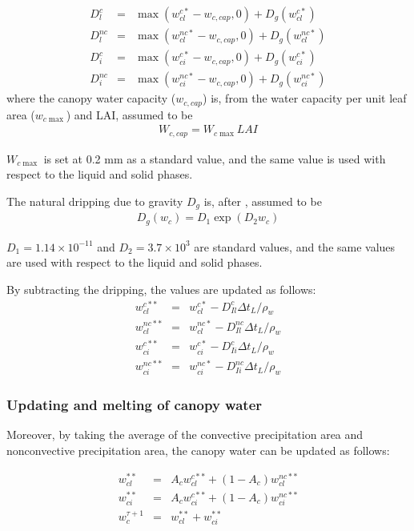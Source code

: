 \begin{eqnarray}
 D_l^c     &=&  \max( w_{cl}^{c*} - w_{c,cap}, 0 ) + D_{g}(w_{cl}^{c*}) \\
 D_l^{nc}  &=&  \max( w_{cl}^{nc*}- w_{c,cap}, 0 ) + D_{g}(w_{cl}^{nc*}) \\
 D_i^c     &=&  \max( w_{ci}^{c*} - w_{c,cap}, 0 ) + D_{g}(w_{ci}^{c*}) \\
 D_i^{nc}  &=&  \max( w_{ci}^{nc*}- w_{c,cap}, 0 ) + D_{g}(w_{ci}^{nc*})
\end{eqnarray} where the canopy water capacity (\(w_{c,cap}\)) is, from the water capacity per unit leaf area (\(w_{c\max}\)) and LAI, assumed to be \begin{eqnarray}
 W_{c,cap} = W_{c\max} LAI
\end{eqnarray}

\(W_{c\max}\) is set at 0.2 mm as a standard value, and the same value is used with respect to the liquid and solid phases.

The natural dripping due to gravity \(D_g\) is, after \citet{Rutter1975-bg}, assumed to be \begin{eqnarray}
 D_g(w_c) = D_1 \exp(D_2 w_c)
\end{eqnarray}

\(D_1=1.14 \times 10 ^{-11}\) and \(D_2=3.7 \times 10^{3}\) are standard values, and the same values are used with respect to the liquid and solid phases.

By subtracting the dripping, the values are updated as follows: \begin{eqnarray}
 w_{cl}^{c**} &=& w_{cl}^{c*}  - D_{Il}^c    \Delta t_L / \rho_w \\
 w_{cl}^{nc**}&=& w_{cl}^{nc*} - D_{Il}^{nc} \Delta t_L / \rho_w \\
 w_{ci}^{c**} &=& w_{ci}^{c*}  - D_{Ii}^c    \Delta t_L / \rho_w \\
 w_{ci}^{nc**}&=& w_{ci}^{nc*} - D_{Ii}^{nc} \Delta t_L / \rho_w
\end{eqnarray}

\subsubsection{Updating and melting of canopy water}\label{updating-and-melting-of-canopy-water}

Moreover, by taking the average of the convective precipitation area and nonconvective precipitation area, the canopy water can be updated as follows:

\begin{eqnarray}
 w_{cl}^{\ast\ast} &=& A_c w_{cl}^{c**} + (1-A_c) w_{cl}^{nc**} \\
 w_{ci}^{\ast\ast} &=& A_c w_{ci}^{c**} + (1-A_c) w_{ci}^{nc**} \\
 w_c^{\tau+1} &=& w_{cl}^{\ast\ast} + w_{ci}^{\ast\ast}
\end{eqnarray}

